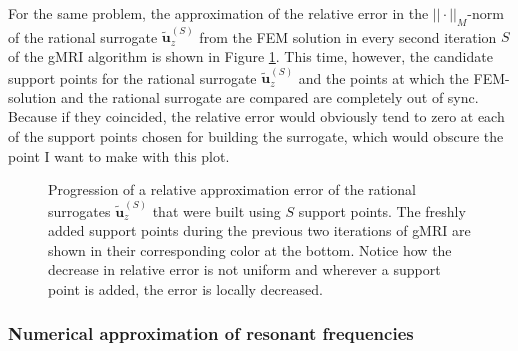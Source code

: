 \documentclass[11pt, a4paper]{article}
\begin{document}
For the same problem, the approximation of the relative error 
in the $||\cdot||_M$-norm of the rational surrogate $\mathbf{\tilde{u}}_z^{(S)}$ from the
\acrshort{FEM} solution in every second iteration $S$ of the \acrshort{gMRI} algorithm
is shown in Figure \ref{fig:rectangular-cavity-errorprogression}. This time,
however, the candidate support points for the rational surrogate $\mathbf{\tilde{u}}_z^{(S)}$
and the points at which the \acrshort{FEM}-solution and the rational surrogate
are compared are completely out of sync. Because if they coincided, the relative error
would obviously tend to zero at each of the support points chosen for building
the surrogate, which would obscure the point I want to make with this plot.

\begin{figure}[ht]
    \centering
    
    \caption{Progression of a relative approximation error of the rational
    surrogates $\mathbf{\tilde{u}}_z^{(S)}$ that were built using $S$ support points.
    The freshly added support points during the previous two iterations of
    \acrshort{gMRI} are shown in their corresponding color at the bottom.
    Notice how the decrease in relative error is not uniform and wherever a
    support point is added, the error is locally decreased.}
    \label{fig:rectangular-cavity-errorprogression}
\end{figure}

\subsubsection{Numerical approximation of resonant frequencies}
\label{subsubsec:root-finding}
\end{document}
